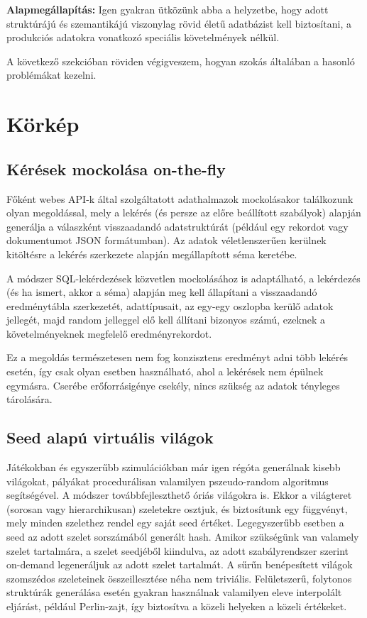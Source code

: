 \documentclass[
    parspace,
    noindent,
    nohyp,
]{elteiktdk}[2023/04/10]
\newcommand{\thesispar}[1]{
\vspace{1em}
\hspace{0.7cm}\parbox[left][][c]{15.8cm}{\linespread{1.2}\selectfont #1}
\vspace{1em}
}
\begin{document}
\thesispar{
    \textbf{Alapmegállapítás:} Igen gyakran ütközünk abba a helyzetbe, hogy adott struktúrájú és szemantikájú
    viszonylag rövid életű adatbázist kell biztosítani,
    a produkciós adatokra vonatkozó speciális követelmények nélkül.
}

A következő szekcióban röviden végigveszem, hogyan szokás általában a hasonló problémákat kezelni.

\section{Körkép}

\subsection{Kérések mockolása on-the-fly}

Főként webes API-k által szolgáltatott adathalmazok mockolásakor találkozunk olyan megoldással,
mely a lekérés (és persze az előre beállított szabályok)
alapján generálja a válaszként visszaadandó adatstruktúrát
(például egy rekordot vagy dokumentumot JSON formátumban).
Az adatok véletlenszerűen kerülnek kitöltésre a lekérés szerkezete alapján megállapított séma keretébe.

A módszer SQL-lekérdezések közvetlen mockolásához is adaptálható,
a lekérdezés (és ha ismert, akkor a séma) alapján meg kell állapítani
a visszaadandó eredménytábla szerkezetét, adattípusait,
az egy-egy oszlopba kerülő adatok jellegét,
majd random jelleggel elő kell állítani bizonyos számú, ezeknek a követelményeknek megfelelő eredményrekordot.

Ez a megoldás természetesen nem fog konzisztens eredményt adni több lekérés esetén,
így csak olyan esetben használható, ahol a lekérések nem épülnek egymásra.
Cserébe erőforrásigénye csekély, nincs szükség az adatok tényleges tárolására.

\subsection{Seed alapú virtuális világok}

Játékokban és egyszerűbb szimulációkban már igen régóta generálnak kisebb világokat,
pályákat procedurálisan valamilyen pszeudo-random algoritmus segítségével.
A módszer továbbfejleszthető óriás világokra is.
Ekkor a világteret (sorosan vagy hierarchikusan) szeletekre osztjuk, és biztosítunk egy függvényt,
mely minden szelethez rendel egy saját seed értéket.
Legegyszerűbb esetben a seed az adott szelet sorszámából generált hash.
Amikor szükségünk van valamely szelet tartalmára, a szelet seedjéből kiindulva,
az adott szabályrendszer szerint on-demand legeneráljuk az adott szelet tartalmát.
A sűrűn benépesített világok szomszédos szeleteinek összeillesztése néha nem triviális.
Felületszerű, folytonos struktúrák generálása esetén gyakran használnak
valamilyen eleve interpolált eljárást, például Perlin-zajt,
így biztosítva a közeli helyeken a közeli értékeket.
\end{document}
